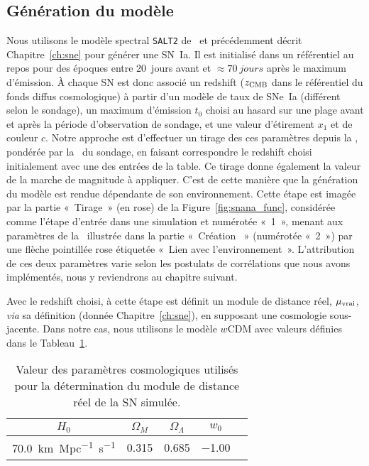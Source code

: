 \documentclass[../main/main.tex]{subfiles}
\begin{document}
\subsection{Génération du modèle}\label{ssec:simsn}

Nous utilisons le modèle spectral \texttt{SALT2} de~\cite{guy2007} et
précédemment décrit Chapitre~\ref{ch:sne} pour générer une SN~Ia. Il est
initialisé dans un référentiel au repos pour des époques entre \SI{20}{jours}
avant et $\approx\SI{70}{jours}$ après le maximum d'émission. À chaque SN est
donc associé un redshift ($z_{\rm CMB}$ dans le référentiel du fonds diffus
cosmologique) à partir d'un modèle de taux de SNe~Ia (différent selon le
sondage), un maximum d'émission $t_0$ choisi au hasard sur une plage avant et
après la période d'observation de sondage, et une valeur d'étirement $x_1$ et de
couleur $c$. Notre approche est d'effectuer un tirage des ces paramètres depuis
la \hostlib, pondérée par la \wgtmap\ du sondage, en faisant correspondre le
redshift choisi initialement avec une des entrées de la table. Ce tirage donne
également la valeur de la marche de magnitude à appliquer. C'est de cette
manière que la génération du modèle est rendue dépendante de son environnement.
Cette étape est imagée par la partie «~Tirage~» (en rose) de la
Figure~\ref{fig:snana_func}, considérée comme l'étape d'entrée dans une
simulation et numérotée «~1~», menant aux paramètres de la \hostlib\ illustrée
dans la partie «~Création \hostlib~» (numérotée «~2~») par une flèche pointillée
rose étiquetée «~Lien avec l'environnement~». L'attribution de ces deux
paramètres varie selon les postulats de corrélations que nous avons implémentés,
nous y reviendrons au chapitre suivant.

Avec le redshift choisi, à cette étape est définit un module de distance réel,
$\mu_{\rm vrai}$, \textit{via} sa définition (donnée Chapitre~\ref{ch:sne}), en
supposant une cosmologie sous-jacente. Dans notre cas, nous utilisons le modèle
$w$CDM avec valeurs définies dans le Tableau~\ref{tab:cosmoinput}.

\begin{table}[ht]
    \centering
    \caption[Valeur des paramètres cosmologiques utilisés pour la détermination
    du module de distance réel de la SN simulée]{Valeur des paramètres
        cosmologiques utilisés pour la détermination du module de distance réel
    de la SN simulée.}
    \label{tab:cosmoinput}
    \begin{tabular}{ccccc}
        \toprule
        $H_0$ & $\Omega_M$ & $\Omega_\Lambda$ & $w_0$ \\
        \midrule
        \SI{70.0}{km.Mpc^{-1}.s^{-1}} & \num{0.315} & \num{0.685} & \num{-1.00}\\ 
        \bottomrule
    \end{tabular}
\end{table}
\end{document}

